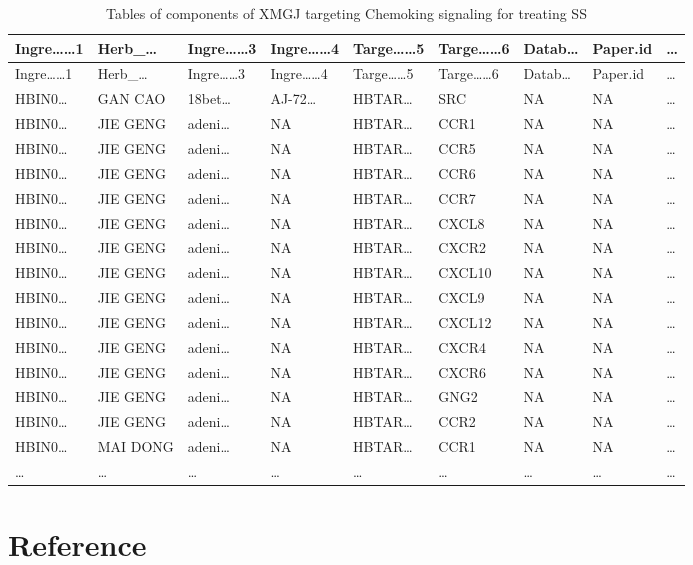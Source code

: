 \documentclass[
]{article}
\begin{document}
\begin{longtable}[]{@{}lllllllll@{}}
\caption{\label{tab:tables-of-components-of-XMGJ-targeting-Chemoking-signaling-for-treating-SS}Tables of components of XMGJ targeting Chemoking signaling for treating SS}\tabularnewline
\toprule
Ingre\ldots\ldots1 & Herb\_\ldots{} & Ingre\ldots\ldots3 & Ingre\ldots\ldots4 & Targe\ldots\ldots5 & Targe\ldots\ldots6 & Datab\ldots{} & Paper.id & \ldots{}\tabularnewline
\midrule
\endfirsthead
\toprule
Ingre\ldots\ldots1 & Herb\_\ldots{} & Ingre\ldots\ldots3 & Ingre\ldots\ldots4 & Targe\ldots\ldots5 & Targe\ldots\ldots6 & Datab\ldots{} & Paper.id & \ldots{}\tabularnewline
\midrule
\endhead
HBIN0\ldots{} & GAN CAO & 18bet\ldots{} & AJ-72\ldots{} & HBTAR\ldots{} & SRC & NA & NA & \ldots{}\tabularnewline
HBIN0\ldots{} & JIE GENG & adeni\ldots{} & NA & HBTAR\ldots{} & CCR1 & NA & NA & \ldots{}\tabularnewline
HBIN0\ldots{} & JIE GENG & adeni\ldots{} & NA & HBTAR\ldots{} & CCR5 & NA & NA & \ldots{}\tabularnewline
HBIN0\ldots{} & JIE GENG & adeni\ldots{} & NA & HBTAR\ldots{} & CCR6 & NA & NA & \ldots{}\tabularnewline
HBIN0\ldots{} & JIE GENG & adeni\ldots{} & NA & HBTAR\ldots{} & CCR7 & NA & NA & \ldots{}\tabularnewline
HBIN0\ldots{} & JIE GENG & adeni\ldots{} & NA & HBTAR\ldots{} & CXCL8 & NA & NA & \ldots{}\tabularnewline
HBIN0\ldots{} & JIE GENG & adeni\ldots{} & NA & HBTAR\ldots{} & CXCR2 & NA & NA & \ldots{}\tabularnewline
HBIN0\ldots{} & JIE GENG & adeni\ldots{} & NA & HBTAR\ldots{} & CXCL10 & NA & NA & \ldots{}\tabularnewline
HBIN0\ldots{} & JIE GENG & adeni\ldots{} & NA & HBTAR\ldots{} & CXCL9 & NA & NA & \ldots{}\tabularnewline
HBIN0\ldots{} & JIE GENG & adeni\ldots{} & NA & HBTAR\ldots{} & CXCL12 & NA & NA & \ldots{}\tabularnewline
HBIN0\ldots{} & JIE GENG & adeni\ldots{} & NA & HBTAR\ldots{} & CXCR4 & NA & NA & \ldots{}\tabularnewline
HBIN0\ldots{} & JIE GENG & adeni\ldots{} & NA & HBTAR\ldots{} & CXCR6 & NA & NA & \ldots{}\tabularnewline
HBIN0\ldots{} & JIE GENG & adeni\ldots{} & NA & HBTAR\ldots{} & GNG2 & NA & NA & \ldots{}\tabularnewline
HBIN0\ldots{} & JIE GENG & adeni\ldots{} & NA & HBTAR\ldots{} & CCR2 & NA & NA & \ldots{}\tabularnewline
HBIN0\ldots{} & MAI DONG & adeni\ldots{} & NA & HBTAR\ldots{} & CCR1 & NA & NA & \ldots{}\tabularnewline
\ldots{} & \ldots{} & \ldots{} & \ldots{} & \ldots{} & \ldots{} & \ldots{} & \ldots{} & \ldots{}\tabularnewline
\bottomrule
\end{longtable}

\hypertarget{bibliography}{%
\section*{Reference}\label{bibliography}}
\end{document}
